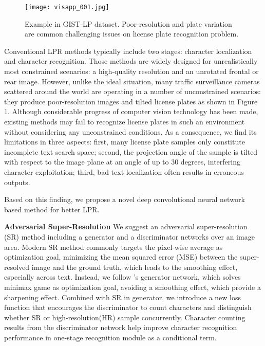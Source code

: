 \documentclass[a4paper,twoside]{article}
\begin{document}
\begin{figure}[t]
    \begin{center}
\texttt{[image: visapp\_001.jpg]}
    \end{center}
       \caption{Example in GIST-LP dataset. Poor-resolution and plate variation are common challenging issues on license plate recognition problem.}
    \label{fig:long}
    \label{fig:onecol}
    \end{figure}

Conventional LPR methods typically include two stages: character localization and character recognition. Those methods are widely designed for unrealistically most constrained scenarios: a high-quality resolution and an unrotated frontal or rear image. However, unlike the ideal situation, many traffic surveillance cameras scattered around the world are operating in a number of unconstrained scenarios: they produce poor-resolution images and tilted license plates as shown in Figure 1. Although considerable progress of computer vision technology has been made, existing methods may fail to recognize license plates in such an environment without considering any unconstrained conditions. As a consequence, we find its limitations in three aspects: first, many license plate samples only constitute incomplete text search space; second, the projection angle of the sample is tilted with respect to the image plane at an angle of up to 30 degrees, interfering character exploitation; third, bad text localization often results in erroneous outputs. 
  
Based on this finding, we propose a novel deep convolutional neural network based method for better LPR.
    
    \textbf{Adversarial Super-Resolution} We suggest an adversarial super-resolution (SR) method including a generator and a discriminator networks over an image area. Modern SR method \cite{dong2014learning} commonly targets the pixel-wise average as optimization goal, minimizing the mean squared error (MSE) between the super-resolved image and the ground truth, which leads to the smoothing effect, especially across text. Instead, we follow \cite{ledig2017photo}'s generator network, which solves minimax game as optimization goal, avoiding a smoothing effect, which provide a sharpening effect. Combined with SR in generator, we introduce a new loss function that encourages the discriminator to count characters and distinguish whether SR or high-resolution(HR) sample concurrently. Character counting results from the discriminator network  help improve character recognition performance in one-stage recognition module as a conditional term.
    
\end{document}
